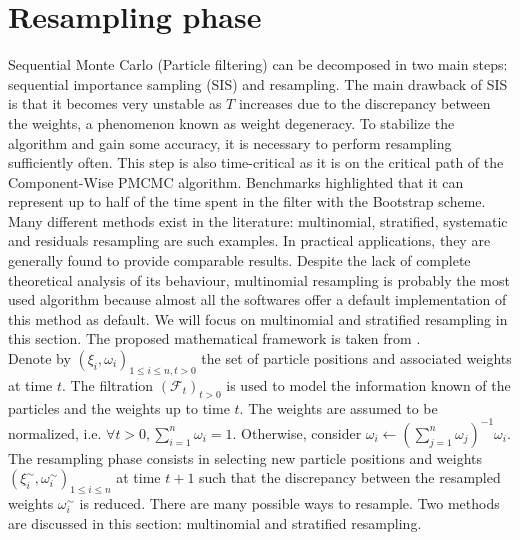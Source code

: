 \documentclass[11pt,a4,twosided,singlespacing,titlepagenumber=on]{scrreprt}
\numberwithin{equation}{chapter} %
\theoremstyle{remark}
\begin{document}
\section{Resampling phase}
Sequential Monte Carlo (Particle filtering) can be decomposed in two main steps: sequential importance sampling (SIS) and resampling. The main drawback of SIS is that it becomes very unstable as $T$ increases due to the discrepancy between the weights, a phenomenon known as weight degeneracy. To stabilize the algorithm and gain some accuracy, it is necessary to perform resampling sufficiently often. This step is also time-critical as it is on the critical path of the Component-Wise PMCMC algorithm. Benchmarks highlighted that it can represent up to half of the time spent in the filter with the Bootstrap scheme. Many different methods exist in the literature: multinomial, stratified, systematic and residuals resampling are such examples. In practical applications, they are generally found to provide comparable results. Despite the lack of complete theoretical analysis of its behaviour, multinomial resampling is probably the most used algorithm because almost all the softwares offer a default implementation of this method as default. We will focus on multinomial and stratified resampling in this section. The proposed mathematical framework is taken from \cite{douc2005}. \\

\noindent
Denote by $\left( \xi_i, \omega_i \right)_{1 \leq i \leq n, t > 0}$ the set of particle positions and associated weights at time $t$. The filtration $(\mathcal{F}_t)_{t > 0}$ is used to model the information known of the particles and the weights up to time $t$. The weights are assumed to be normalized, i.e. $\forall t > 0, \sum_{i=1}^n \omega_i = 1$. Otherwise, consider $\omega_i \leftarrow \left( \sum_{j=1}^n \omega_j\right)^{-1} \omega_i$. The resampling phase consists in selecting new particle positions and weights $\left( \xi_i^\sim, \omega_i^\sim \right)_{1 \leq i \leq n}$ at time $t+1$ such that the discrepancy between the resampled weights $\omega_i^\sim$ is reduced. There are many possible ways to resample. Two methods are discussed in this section: multinomial and stratified resampling. \\
\end{document}
